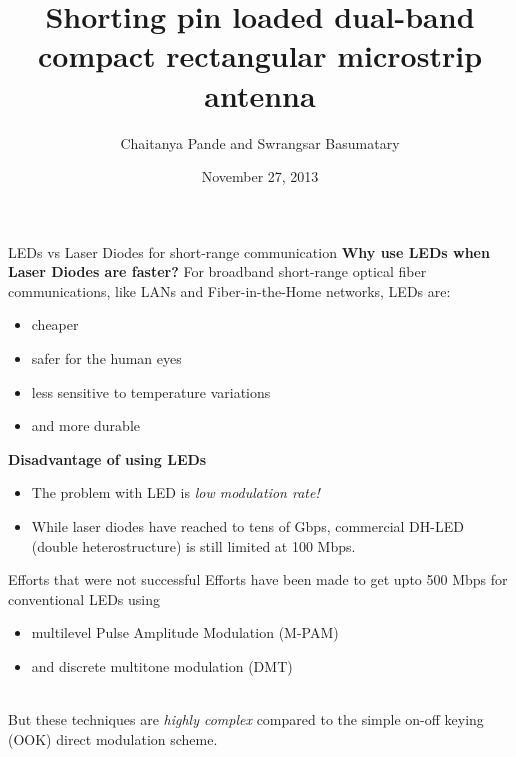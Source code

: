 \documentclass[mathserif]{beamer}
\title{Shorting pin loaded dual-band compact rectangular microstrip antenna}
\author{Chaitanya Pande and
Swrangsar Basumatary}
\institute{IIT Bombay, Powai}
\date{November 27, 2013}
\begin{document}
    \frame{\titlepage}
    
    \begin{frame}{LEDs vs Laser Diodes for short-range communication}
	    \pause
	    \textbf{Why use LEDs when Laser Diodes are faster?}
            \pause For broadband short-range optical fiber communications, like
LANs and Fiber-in-the-Home networks, LEDs are:
            \pause
            \begin{itemize}[<+->]
                \item cheaper
                \item safer for the human eyes
                \item less sensitive to temperature variations
                \item and more durable
            \end{itemize}
  
        \pause
        \textbf{Disadvantage of using LEDs}
            \begin{itemize}
                \pause \item The problem with LED is \pause \emph{low modulation rate!}\\
                \pause \item While laser diodes have reached to tens of Gbps, \pause 
                commercial DH-LED (double heterostructure) is still limited at 100 Mbps.
            \end{itemize}
        
    \end{frame}
    
    \begin{frame}{Efforts that were not successful}
        \pause
        Efforts have been made to get upto 500 Mbps for conventional LEDs using
        \begin{itemize}
            \pause \item multilevel Pulse Amplitude Modulation (M-PAM)
            \pause \item and discrete multitone modulation (DMT) \\~\\
        \end{itemize} 
        
        \pause But these techniques are \emph{highly complex} compared to the simple on-off keying (OOK) direct modulation scheme.
    \end{frame}
    
    
    
\end{document}

